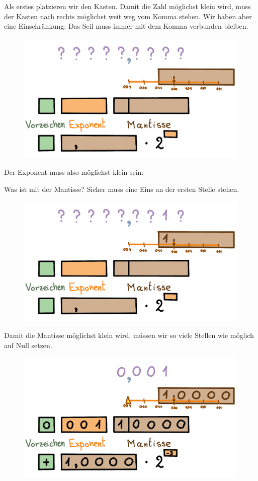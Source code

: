 Als erstes platzieren wir den Kasten. Damit die Zahl möglichst klein wird, muss der Kasten nach rechts möglichst weit weg vom Komma stehen. Wir haben aber eine Einschränkung: Das Seil muss immer mit dem Komma verbunden bleiben.
\begin{figure}[H]
\centering
\includegraphics[width=0.85\linewidth]{Pictures/kleinsteZahl1.png}
\end{figure}
Der Exponent muss also möglichst klein sein.

Was ist mit der Mantisse? Sicher muss eine Eins an der ersten Stelle stehen.
\begin{figure}[H]
\centering
\includegraphics[width=0.85\linewidth]{Pictures/kleinsteZahl2.png}
\end{figure}

Damit die Mantisse möglichst klein wird, müssen wir so viele Stellen wie möglich auf Null setzen.
\begin{figure}[H]
\centering
\includegraphics[width=0.85\linewidth]{Pictures/kleinsteZahl3.png}
\end{figure}

